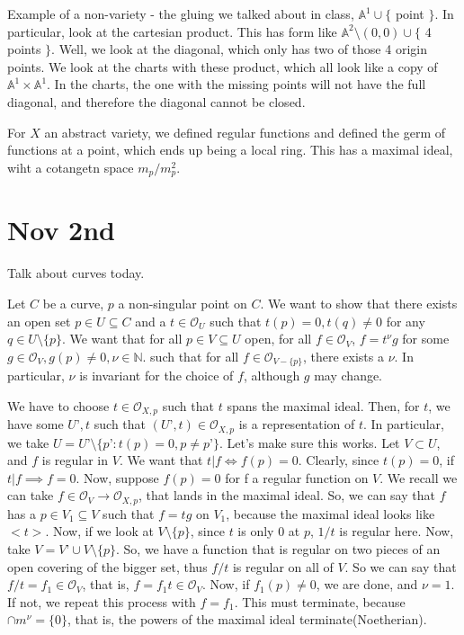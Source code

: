 \documentclass[10pt]{article}
\begin{document}
Example of a non-variety - the gluing we talked about in class, $\mathbb{A}^1 \cup \{$ point $\}$. In particular, look at the cartesian product. This has form like $\mathbb{A}^2 \setminus (0,0) \cup \{ $ 4 points $ \}$. Well, we look at the diagonal, which only has two of those 4 origin points. We look at the charts with these product, which all look like a copy of $\mathbb{A}^1 \times \mathbb{A}^1$. In the charts, the one with the missing points will not have the full diagonal, and therefore the diagonal cannot be closed. 

For $X$ an abstract variety, we defined regular functions and defined the germ of functions at a point, which ends up being a local ring. This has a maximal ideal, wiht a cotangetn space $m_p / m_p^2$.

\section{Nov 2nd}

Talk about curves today.

Let $C$ be a curve, $p$ a non-singular point on $C$. We want to show that there exists an open set $p \in U \subseteq C$ and a $t \in \mathcal{O}_U$ such that $t(p) = 0, t(q) \not = 0$ for any $q \in U \setminus \{ p \}$. We want that for all $p \in V \subseteq U$ open, for all $f \in \mathcal{O}_V$, $f = t^\nu g$ for some $g \in \mathcal{O}_V, g(p) \not = 0, \nu \in \mathbb{N}$. such that for all $f \in \mathcal{O}_{V - \{ p \}}$, there exists a $\nu$. In particular, $\nu$ is invariant for the choice of $f$, although $g$ may change.

We have to choose $t \in \mathcal{O}_{X,p}$ such that $t$ spans the maximal ideal. Then, for $t$, we have some $U’, t$ such that $(U’,t) \in \mathcal{O}_{X,p}$ is a representation of $t$. In particular, we take $U = U’ \setminus \{ p’ : t(p) = 0, p \not = p’ \}$. Let’s make sure this works. Let $V \subset U$, and $f$ is regular in $V$. We want that $t | f \iff f(p) = 0$. Clearly, since $t(p) = 0$, if $t | f \implies f = 0$. Now, suppose $f(p) = 0$ for f a regular function on $V$. We recall we can take $f \in \mathcal{O}_V \to \mathcal{O}_{X,p}$, that lands in the maximal ideal. So, we can say that $f$ has a $p \in V_1 \subseteq V$ such that $f = tg$ on $V_1$, because the maximal ideal looks like $<t>$. Now, if we look at $V \setminus \{ p \}$, since $t$ is only 0 at $p$, $1/t$ is regular here. Now, take $V = V’ \cup V \setminus \{ p \}$. So, we have a function that is regular on two pieces of an open covering of the bigger set, thus $f/t$ is regular on all of $V$. So we can say that $f/t = f_1 \in \mathcal{O}_V$, that is, $f = f_1t \in \mathcal{O}_V$. Now, if $f_1(p) \not = 0$, we are done, and $\nu = 1$. If not, we repeat this process with $f = f_1$. This must terminate, because $\cap m^{\nu} = \{ 0 \}$, that is, the powers of the maximal ideal terminate(Noetherian).
\end{document}
